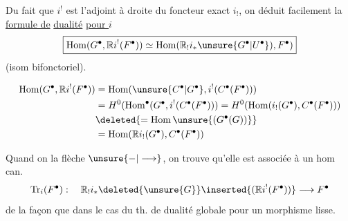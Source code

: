 
Du fait que $i^!$ est l'adjoint à droite
du foncteur exact  $i_!$, on
déduit facilement la \uline{formule de}
\uline{dualité} \uline{pour $i$}
\[
\boxed{\operatorname{Hom}(G^\bullet,\mathbb{R}i^!(F^\bullet))
\simeq\operatorname{Hom}(\mathbb{R}_!i_*\unsure{G^\bullet|U^\bullet}),F^\bullet)}
\]
(isom bifonctoriel).

\[
\begin{aligned}
\operatorname{Hom}(G^\bullet,\mathbb{R}i^!(F^\bullet))
&=\operatorname{Hom}(\unsure{C^\bullet|G^\bullet},i^!(C^\bullet(F^\bullet)))\\
&=H^0(\operatorname{Hom}^{\bullet}(G^\bullet,i^!(C^\bullet(F^\bullet)))
=H^0(\operatorname{Hom}(i_!(G^\bullet),C^\bullet(F^\bullet)))\\
&\deleted{=\operatorname{Hom}\unsure{(G^\bullet(G))}}\\
&=\operatorname{Hom}(\mathbb{R}i_!(G^\bullet),C^\bullet(F^\bullet))
\end{aligned}
\]

Quand on  la flèche $\unsure{-|\longrightarrow}$, on trouve
qu'elle est associée à un hom can.
\[
\operatorname{Tr}_i(F^\bullet):\quad
\mathbb{R}_!i_*\deleted{\unsure{G}}\inserted{(\mathbb{R}i^!(F^\bullet))}
\longrightarrow F^\bullet
\]
de la  façon que dans le cas du th.
de dualité globale pour un morphisme
lisse.
